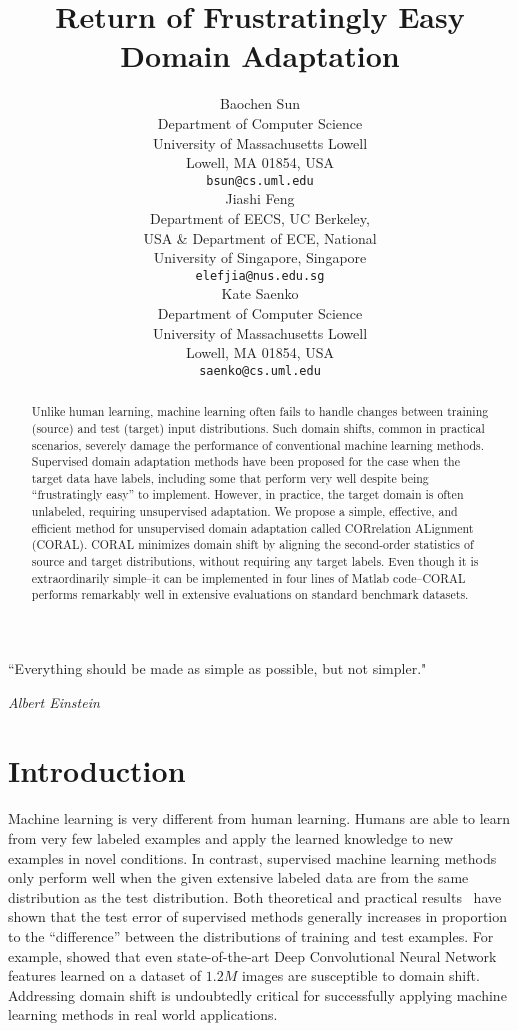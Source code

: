 \documentclass[letterpaper]{article}
\title{Return of Frustratingly Easy Domain Adaptation}
\author{
Baochen Sun\\
Department of Computer Science\\
University of Massachusetts Lowell\\
Lowell, MA 01854, USA \\
\texttt{bsun@cs.uml.edu} \\
\And
Jiashi Feng\\
Department of EECS, UC Berkeley,\\
USA \& Department of ECE, National\\
University of Singapore,  Singapore\\
\texttt{elefjia@nus.edu.sg} \\
\And
Kate Saenko\\
Department of Computer Science\\
University of Massachusetts Lowell\\
Lowell, MA 01854, USA \\
\texttt{saenko@cs.uml.edu} \\
}
\begin{document}
\nocopyright \frenchspacing
\maketitle

\begin{abstract}
Unlike human learning, machine learning often fails to handle changes between training (source) and test (target) input distributions. Such domain shifts, common in practical scenarios, severely damage the performance of conventional machine learning methods. 
Supervised domain adaptation methods have been proposed for the case when the target data have labels, including some that perform very well despite being ``frustratingly easy'' to implement. However, in practice, the target domain is often unlabeled, requiring unsupervised adaptation.
We propose a simple, effective, and efficient method for unsupervised domain adaptation called CORrelation ALignment (CORAL). CORAL minimizes domain shift by aligning the second-order statistics of source and target distributions, without requiring any target labels. 
Even though it is extraordinarily simple--it can be implemented in four lines of Matlab code--CORAL performs remarkably well in extensive evaluations on standard benchmark datasets.
\end{abstract}

\epigraph{``Everything should be made as simple as possible, but not simpler."}{\textit{Albert Einstein}}
\section{Introduction}
\label{sec:intro}
Machine learning is very different from human learning. Humans are able to learn from very few labeled examples and apply the learned knowledge to new examples in novel conditions. In contrast, supervised machine learning methods only perform well when the given extensive labeled data are from the same distribution as the test distribution. Both theoretical \cite{bendavid,Blitzer07Biographies} and practical results~\cite{saenko2010adapting,efros-cvpr11} have shown that the test error of supervised methods generally increases in proportion to the ``difference'' between the distributions of training and test examples. For example, \citeauthor{decaf}  showed that even state-of-the-art Deep Convolutional Neural Network features learned on a  dataset of $1.2M$ images are susceptible to domain shift.
Addressing domain shift is undoubtedly critical for successfully applying machine learning methods in real world applications.
\end{document}
